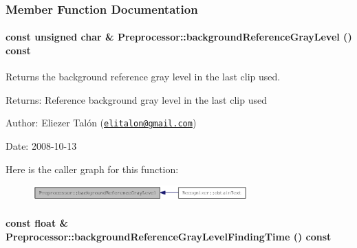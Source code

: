 \subsubsection{Member Function Documentation}
\hypertarget{class_preprocessor_b435116619b7b254d9e788476c012e8a}{
\paragraph[{backgroundReferenceGrayLevel}]{\setlength{\rightskip}{0pt plus 5cm}const unsigned char \& Preprocessor::backgroundReferenceGrayLevel () const}\hfill}
\label{class_preprocessor_b435116619b7b254d9e788476c012e8a}


Returns the background reference gray level in the last clip used. 

\begin{Desc}
\item[Returns:]Reference background gray level in the last clip used\end{Desc}
\begin{Desc}
\item[Author:]Eliezer Talón (\href{mailto:elitalon@gmail.com}{\tt elitalon@gmail.com}) \end{Desc}
\begin{Desc}
\item[Date:]2008-10-13 \end{Desc}


Here is the caller graph for this function:\nopagebreak
\begin{figure}[H]
\begin{center}
\leavevmode
\includegraphics[width=234pt]{class_preprocessor_b435116619b7b254d9e788476c012e8a_icgraph}
\end{center}
\end{figure}
\hypertarget{class_preprocessor_001ec84b94a5d92a2bce6b854b4d3e7d}{
\paragraph[{backgroundReferenceGrayLevelFindingTime}]{\setlength{\rightskip}{0pt plus 5cm}const float \& Preprocessor::backgroundReferenceGrayLevelFindingTime () const}\hfill}
\label{class_preprocessor_001ec84b94a5d92a2bce6b854b4d3e7d}


